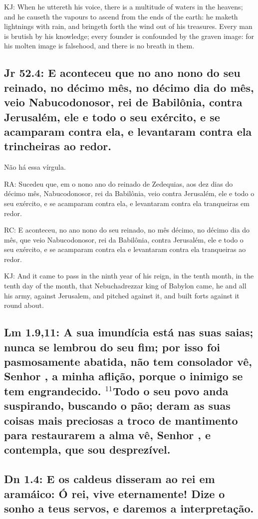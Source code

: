 KJ: When he uttereth his voice, there is a multitude of waters in the heavens; and he causeth the vapours to ascend from the ends of the earth: he maketh lightnings with rain, and bringeth forth the wind out of his treasures. Every man is brutish by his knowledge; every founder is confounded by the graven image: for his molten image is falsehood, and there is no breath in them.

\subsection{Jr 52.4: E aconteceu\uwave{,} que no ano nono do seu reinado, no décimo mês, no décimo dia do mês, veio Nabucodonosor, rei de Babilônia, contra Jerusalém, ele e todo o seu exército, e se acamparam contra ela, e levantaram contra ela trincheiras ao redor.}

Não há essa vírgula.

RA: Sucedeu que, em o nono ano do reinado de Zedequias, aos dez dias do décimo mês, Nabucodonosor, rei da Babilônia, veio contra Jerusalém, ele e todo o seu exército, e se acamparam contra ela, e levantaram contra ela tranqueiras em redor.

RC: E aconteceu, no ano nono do seu reinado, no mês décimo, no décimo dia do mês, que veio Nabucodonosor, rei da Babilônia, contra Jerusalém, ele e todo o seu exército, e se acamparam contra ela e levantaram contra ela tranqueiras ao redor.

KJ: And it came to pass in the ninth year of his reign, in the tenth month, in the tenth day of the month, that Nebuchadrezzar king of Babylon came, he and all his army, against Jerusalem, and pitched against it, and built forts against it round about.

\subsection{Lm 1.9,11: A sua imundícia está nas suas saias; nunca se lembrou do seu fim; por isso foi pasmosamente abatida, não tem consolador\uwave{;} vê, Senhor , a minha aflição, porque o inimigo se tem engrandecido. $^{\mathrm{11}}$Todo o seu povo anda suspirando, buscando o pão; deram as suas coisas mais preciosas a troco de mantimento para restaurarem a alma\uwave{;} vê, Senhor , e contempla, que sou desprezível.}

\subsection{Dn 1.4: E os caldeus disseram ao rei em aramáico: Ó rei, vive eternamente! Dize o sonho a teus servos, e daremos a interpretação.}

